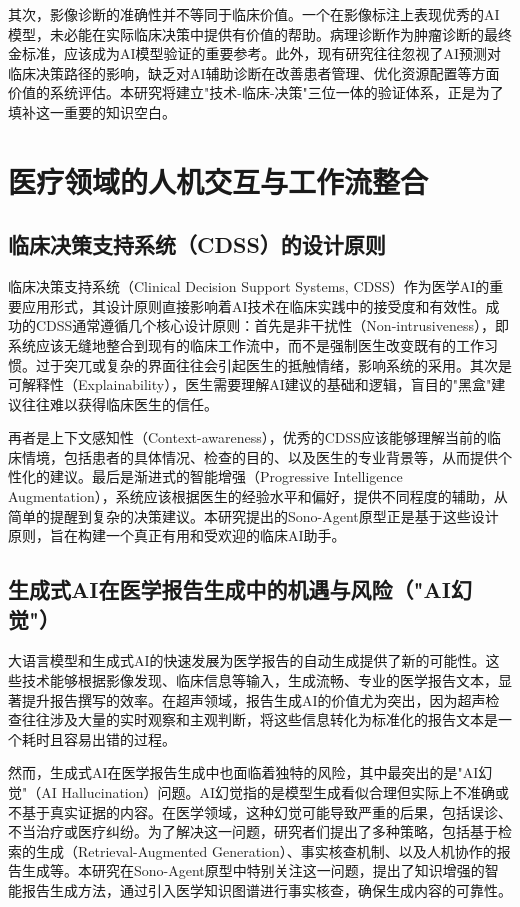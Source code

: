 其次，影像诊断的准确性并不等同于临床价值。一个在影像标注上表现优秀的AI模型，未必能在实际临床决策中提供有价值的帮助。病理诊断作为肿瘤诊断的最终金标准，应该成为AI模型验证的重要参考。此外，现有研究往往忽视了AI预测对临床决策路径的影响，缺乏对AI辅助诊断在改善患者管理、优化资源配置等方面价值的系统评估。本研究将建立"技术-临床-决策"三位一体的验证体系，正是为了填补这一重要的知识空白。

\section{医疗领域的人机交互与工作流整合}

\subsection{临床决策支持系统（CDSS）的设计原则}

临床决策支持系统（Clinical Decision Support Systems, CDSS）作为医学AI的重要应用形式，其设计原则直接影响着AI技术在临床实践中的接受度和有效性。成功的CDSS通常遵循几个核心设计原则：首先是非干扰性（Non-intrusiveness），即系统应该无缝地整合到现有的临床工作流中，而不是强制医生改变既有的工作习惯。过于突兀或复杂的界面往往会引起医生的抵触情绪，影响系统的采用。其次是可解释性（Explainability），医生需要理解AI建议的基础和逻辑，盲目的"黑盒"建议往往难以获得临床医生的信任。

再者是上下文感知性（Context-awareness），优秀的CDSS应该能够理解当前的临床情境，包括患者的具体情况、检查的目的、以及医生的专业背景等，从而提供个性化的建议。最后是渐进式的智能增强（Progressive Intelligence Augmentation），系统应该根据医生的经验水平和偏好，提供不同程度的辅助，从简单的提醒到复杂的决策建议。本研究提出的Sono-Agent原型正是基于这些设计原则，旨在构建一个真正有用和受欢迎的临床AI助手。

\subsection{生成式AI在医学报告生成中的机遇与风险（"AI幻觉"）}

大语言模型和生成式AI的快速发展为医学报告的自动生成提供了新的可能性。这些技术能够根据影像发现、临床信息等输入，生成流畅、专业的医学报告文本，显著提升报告撰写的效率。在超声领域，报告生成AI的价值尤为突出，因为超声检查往往涉及大量的实时观察和主观判断，将这些信息转化为标准化的报告文本是一个耗时且容易出错的过程。

然而，生成式AI在医学报告生成中也面临着独特的风险，其中最突出的是"AI幻觉"（AI Hallucination）问题。AI幻觉指的是模型生成看似合理但实际上不准确或不基于真实证据的内容。在医学领域，这种幻觉可能导致严重的后果，包括误诊、不当治疗或医疗纠纷。为了解决这一问题，研究者们提出了多种策略，包括基于检索的生成（Retrieval-Augmented Generation）、事实核查机制、以及人机协作的报告生成等。本研究在Sono-Agent原型中特别关注这一问题，提出了知识增强的智能报告生成方法，通过引入医学知识图谱进行事实核查，确保生成内容的可靠性。

